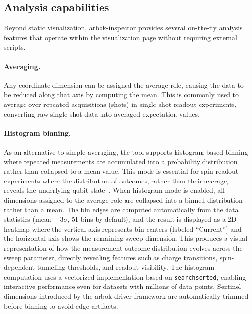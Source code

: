 \subsection{Analysis capabilities}

Beyond static visualization, arbok-inspector provides several on-the-fly analysis features that operate within the visualization page without requiring external scripts.

\paragraph{Averaging.}
Any coordinate dimension can be assigned the average role, causing the data to be reduced along that axis by computing the mean.
This is commonly used to average over repeated acquisitions (shots) in single-shot readout experiments, converting raw single-shot data into averaged expectation values.

\paragraph{Histogram binning.}
As an alternative to simple averaging, the tool supports histogram-based binning where repeated measurements are accumulated into a probability distribution rather than collapsed to a mean value.
This mode is essential for spin readout experiments where the distribution of outcomes, rather than their average, reveals the underlying qubit state~\cite{jones2026midcircuit, huang2024fidelity}.
When histogram mode is enabled, all dimensions assigned to the average role are collapsed into a binned distribution rather than a mean.
The bin edges are computed automatically from the data statistics (mean $\pm\,3\sigma$, 51 bins by default), and the result is displayed as a 2D heatmap where the vertical axis represents bin centers (labeled ``Current'') and the horizontal axis shows the remaining sweep dimension.
This produces a visual representation of how the measurement outcome distribution evolves across the sweep parameter, directly revealing features such as charge transitions, spin-dependent tunneling thresholds, and readout visibility.
The histogram computation uses a vectorized implementation based on \texttt{searchsorted}, enabling interactive performance even for datasets with millions of data points.
Sentinel dimensions introduced by the arbok-driver framework are automatically trimmed before binning to avoid edge artifacts.


